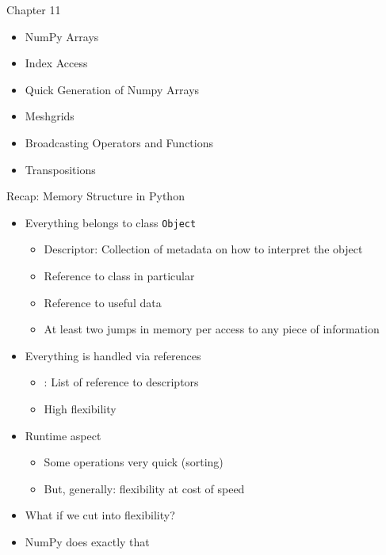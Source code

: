 
\begin{frame}[fragile]{Chapter 11}
%
\begin{itemize}
\item NumPy Arrays
\item Index Access
\item Quick Generation of Numpy Arrays
\item Meshgrids
\item Broadcasting Operators and Functions
\item Transpositions
\end{itemize}
%
\end{frame}


\begin{frame}[fragile]{Recap: Memory Structure in Python}
%
\begin{itemize}
\item Everything belongs to class \texttt{Object}
	\begin{itemize}
	\item Descriptor: Collection of metadata on how to interpret the object
	\item Reference to class in particular
	\item Reference to useful data
	\item[\Thus] At least two jumps in memory per access to any piece of information
	\end{itemize}
\item Everything is handled via references
	\begin{itemize}
	\item {}: List of reference to descriptors
	\item High flexibility
	\end{itemize}
\item Runtime aspect
	\begin{itemize}
	\item Some operations very quick (\eg sorting)
	\item But, generally: flexibility at cost of speed
	\end{itemize}
\item[\Thus] What if we cut into flexibility?
\item[\Thus] NumPy does exactly that
\end{itemize}
%
\end{frame}

